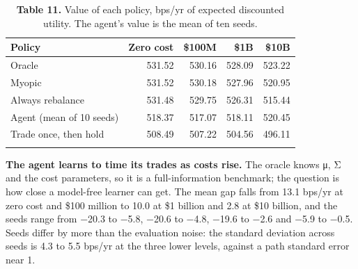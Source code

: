 \documentclass[
  11pt]{article}
\begin{document}
\begin{table}[htbp]
\centering\small
\caption{\textbf{Table 11.} Value of each policy, bps/yr of expected
discounted utility. The agent's value is the mean of ten
seeds.}
\begin{tabular}{@{}lrrrr@{}}
\toprule\noalign{}
Policy & Zero cost & \$100M & \$1B & \$10B \\
\midrule\noalign{}
Oracle & 531.52 & 530.16 & 528.09 & 523.22 \\
Myopic & 531.52 & 530.18 & 527.96 & 520.95 \\
Always rebalance & 531.48 & 529.75 & 526.31 & 515.44 \\
Agent (mean of 10 seeds) & 518.37 & 517.07 & 518.11 & 520.45 \\
Trade once, then hold & 508.49 & 507.22 & 504.56 & 496.11 \\
\bottomrule\noalign{}
\end{tabular}
\end{table}

\textbf{The agent learns to time its trades as costs rise.} The oracle
knows μ, Σ and the cost parameters, so it is a full-information
benchmark; the question is how close a model-free learner can get. The
mean gap falls from 13.1 bps/yr at zero cost and \$100 million to 10.0
at \$1 billion and 2.8 at \$10 billion, and the seeds range from −20.3
to −5.8, −20.6 to −4.8, −19.6 to −2.6 and −5.9 to −0.5. Seeds differ by
more than the evaluation noise: the standard deviation across seeds is
4.3 to 5.5 bps/yr at the three lower levels, against a path standard
error near 1.
\end{document}
